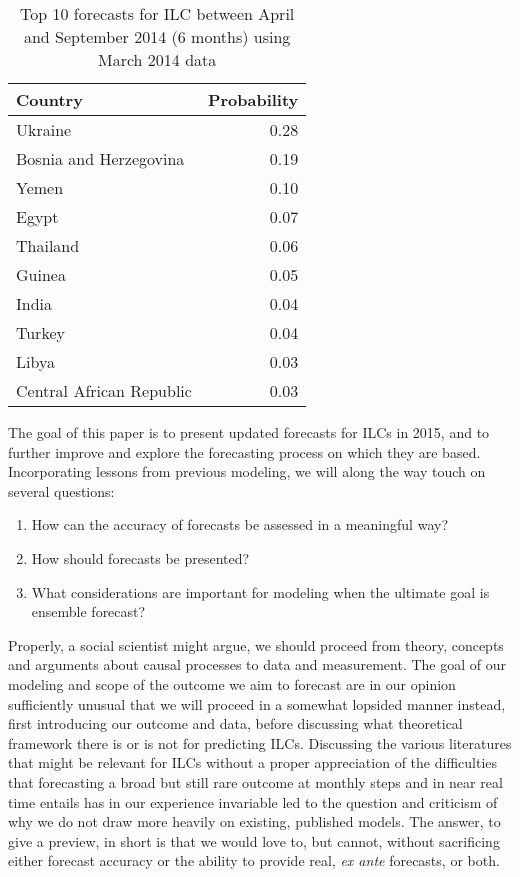 \documentclass[pdftex,11pt]{article}
\begin{document}
\begin{table}
\caption{Top 10 forecasts for ILC between April and September 2014 (6 months) using March 2014 data} 
\label{tab:forecast}
\centering
\begin{tabular}{lr}
  \midrule
Country & Probability \\ 
  \midrule
Ukraine & 0.28 \\ 
  Bosnia and Herzegovina & 0.19 \\ 
  Yemen & 0.10 \\ 
  Egypt & 0.07 \\ 
  Thailand & 0.06 \\ 
  Guinea & 0.05 \\ 
  India & 0.04 \\ 
  Turkey & 0.04 \\ 
  Libya & 0.03 \\ 
  Central African Republic & 0.03 \\
   \midrule
\end{tabular}
\end{table}

The goal of this paper is to present updated forecasts for ILCs in 2015, and to further improve and explore the forecasting process on which they are based. Incorporating lessons from previous modeling, we will along the way touch on several questions:
\begin{enumerate}
\item How can the accuracy of forecasts be assessed in a meaningful way?
\item How should forecasts be presented?
\item What considerations are important for modeling when the ultimate goal is ensemble forecast?
\end{enumerate}

Properly, a social scientist might argue, we should proceed from theory, concepts and arguments about causal processes to data and measurement. The goal of our modeling and scope of the outcome we aim to forecast are in our opinion sufficiently unusual that we will proceed in a somewhat lopsided manner instead, first introducing our outcome and data, before discussing what theoretical framework there is or is not for predicting ILCs. Discussing the various literatures that might be relevant for ILCs without a proper appreciation of the difficulties that forecasting a broad but still rare outcome at monthly steps and in near real time entails has in our experience invariable led to the question and criticism of why we do not draw more heavily on existing, published models. The answer, to give a preview, in short is that we would love to, but cannot, without sacrificing either forecast accuracy or the ability to provide real, \textit{ex ante} forecasts, or both. 
\end{document}
